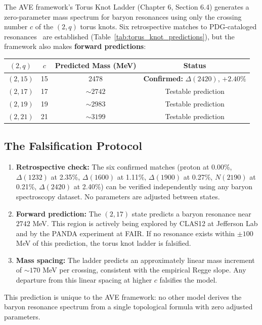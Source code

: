 The AVE framework's Torus Knot Ladder (Chapter 6, Section 6.4) generates a zero-parameter mass spectrum for baryon resonances using only the crossing number $c$ of the $(2,q)$ torus knots. Six retrospective matches to PDG-cataloged resonances~\cite{pdg2022} are established (Table~\ref{tab:torus_knot_predictions}), but the framework also makes \textbf{forward predictions}:

\begin{center}
\begin{tabular}{|c|c|c|c|}
\hline
$(2,q)$ & $c$ & Predicted Mass (MeV) & Status \\ \hline
$(2,15)$ & 15 & 2478 & \textbf{Confirmed:} $\Delta(2420)$, $+2.40\%$ \\
$(2,17)$ & 17 & $\sim 2742$ & Testable prediction \\
$(2,19)$ & 19 & $\sim 2983$ & Testable prediction \\
$(2,21)$ & 21 & $\sim 3199$ & Testable prediction \\ \hline
\end{tabular}
\label{tab:torus_knot_predictions}
\end{center}

\subsection{The Falsification Protocol}
\begin{enumerate}
    \item \textbf{Retrospective check:} The six confirmed matches (proton at 0.00\%, $\Delta(1232)$ at 2.35\%, $\Delta(1600)$ at 1.11\%, $\Delta(1900)$ at 0.27\%, $N(2190)$ at 0.21\%, $\Delta(2420)$ at 2.40\%) can be verified independently using any baryon spectroscopy dataset. No parameters are adjusted between states.
    \item \textbf{Forward prediction:} The $(2,17)$ state predicts a baryon resonance near $2742$ MeV. This region is actively being explored by CLAS12 at Jefferson Lab and by the PANDA experiment at FAIR. If no resonance exists within $\pm 100$ MeV of this prediction, the torus knot ladder is falsified.
    \item \textbf{Mass spacing:} The ladder predicts an approximately linear mass increment of $\sim 170$ MeV per crossing, consistent with the empirical Regge slope. Any departure from this linear spacing at higher $c$ falsifies the model.
\end{enumerate}

This prediction is unique to the AVE framework: no other model derives the baryon resonance spectrum from a single topological formula with zero adjusted parameters.